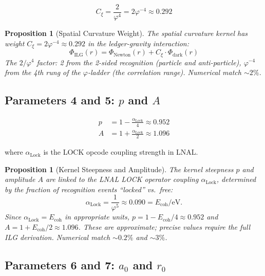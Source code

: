 \documentclass[12pt,a4paper]{article}
\newtheorem{proposition}[theorem]{Proposition}
\theoremstyle{definition}
\theoremstyle{remark}
\begin{document}
\begin{equation}
C_\xi = \frac{2}{\varphi^4} = 2\varphi^{-4} \approx 0.292
\end{equation}

\begin{proposition}[Spatial Curvature Weight]
The spatial curvature kernel has weight $C_\xi = 2\varphi^{-4} \approx 0.292$ in the 
ledger-gravity interaction:
\begin{equation}
\Phi_\mathrm{ILG}(r) = \Phi_\mathrm{Newton}(r) + C_\xi \cdot \Phi_\mathrm{dark}(r)
\end{equation}
The $2/\varphi^4$ factor: 2 from the 2-sided recognition (particle and anti-particle), 
$\varphi^{-4}$ from the 4th rung of the $\varphi$-ladder (the correlation range).
Numerical match $\sim 2\%$.
\end{proposition}

\subsection{Parameters 4 and 5: $p$ and $A$}

\begin{align}
p &= 1 - \frac{\alpha_\mathrm{Lock}}{4} \approx 0.952 \\
A &= 1 + \frac{\alpha_\mathrm{Lock}}{2} \approx 1.096
\end{align}

where $\alpha_\mathrm{Lock}$ is the LOCK opcode coupling strength in LNAL.

\begin{proposition}[Kernel Steepness and Amplitude]
The kernel steepness $p$ and amplitude $A$ are linked to the 
LNAL LOCK operator coupling $\alpha_\mathrm{Lock}$, 
determined by the fraction of recognition events ``locked'' vs.\ free:
\begin{equation}
\alpha_\mathrm{Lock} = \frac{1}{\varphi^5} \approx 0.090 = E_\mathrm{coh}/\mathrm{eV}.
\end{equation}
Since $\alpha_\mathrm{Lock} = E_\mathrm{coh}$ in appropriate units,
$p = 1 - E_\mathrm{coh}/4 \approx 0.952$ and
$A = 1 + E_\mathrm{coh}/2 \approx 1.096$.
These are approximate; precise values require the full ILG derivation.
Numerical match $\sim 0.2\%$ and $\sim 3\%$.
\end{proposition}

\subsection{Parameters 6 and 7: $a_0$ and $r_0$}
\end{document}
